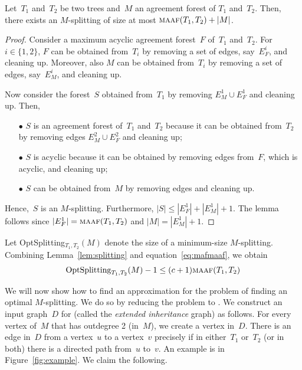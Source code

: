 \begin{lemma}\label{lem:splitting}
Let~$T_1$ and~$T_2$ be two trees and~$M$ an agreement forest of $T_1$ and~$T_2$. Then, there exists an {$M$-splitting} of size at most $\text{{\sc maaf}}(T_1,T_2)+|M|$.
\end{lemma}
\begin{proof}
Consider a maximum acyclic agreement forest~$F$ of~$T_1$ and~$T_2$. For ${i\in\{1,2\}}$, $F$ can be obtained from~$T_i$ by removing a set of edges, say~$E_F^i$, and cleaning up. Moreover, also $M$ can be obtained from~$T_i$ by removing a set of edges, say~$E_M^i$, and cleaning up.

Now consider the forest~$S$ obtained from~$T_1$ by removing $E_M^1\cup E_F^1$ and cleaning up. Then,
\begin{itemize}
\item[$\bullet$] $S$ is an agreement forest of~$T_1$ and~$T_2$ because it can be obtained from~$T_2$ by removing edges $E_M^2\cup E_F^2$ and cleaning up;
\item[$\bullet$] $S$ is acyclic because it can be obtained by removing edges from~$F$, which is acyclic, and cleaning up;
\item[$\bullet$] $S$ can be obtained from~$M$ by removing edges and cleaning up.
\end{itemize}

Hence,~$S$ is an $M$-splitting. Furthermore, $|S| \leq |E_F^1| + |E_M^1| +1$. The lemma follows since $|E_F^1|  = \text{{\sc maaf}}(T_1,T_2)$ and $|M|= |E_M^1| +1$.
\end{proof}

Let {OptSplitting$_{T_1,T_2}(M)$} denote the size of a minimum-size $M$-splitting. Combining  Lemma~\ref{lem:splitting} and equation~\eqref{eq:mafmaaf}, we obtain
\begin{equation}\label{eq:mafmaaf2}
\text{OptSplitting}_{T_1,T_2}(M) -1 \leq (c+1) \text{{\sc maaf}}(T_1,T_2)
\end{equation}

We will now show how to find an approximation for the problem of finding an optimal $M$-splitting. We do so by reducing the problem to {\sc \dfvs}. We construct an input graph~$D$ for {\sc \dfvs} {(called the \emph{extended inheritance} graph)} as follows. For every vertex of~$M$ that has outdegree 2 (in~$M$), we create a vertex in~$D$. There is an edge in~$D$ from a vertex~$u$ to a vertex~$v$ precisely if in either~$T_1$ or~$T_2$ (or in both) there is a directed path from~$u$ to~$v$. {An example is in Figure~\ref{fig:example}.} We claim the following.

